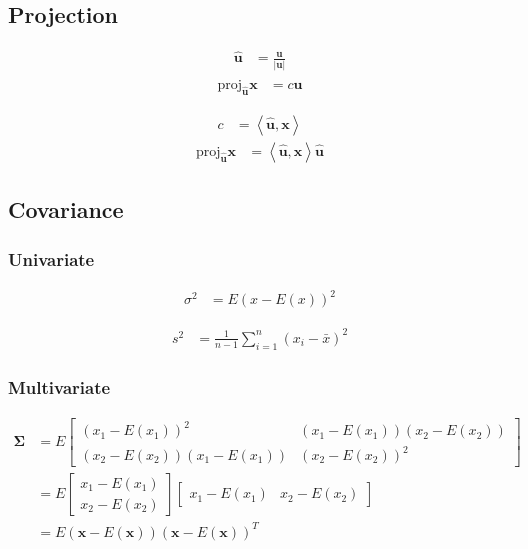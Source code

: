 \documentclass{article}
\begin{document}
\subsection{Projection}

\begin{align}
	\hat{\mathbf{u}} & =\frac{\mathbf{u}}{\left|\mathbf{u}\right|}
\end{align}
\begin{align}
	\textrm{proj}_{\hat{\mathbf{u}}}\mathbf{x} & =c\hat{\mathbf{u}}
\end{align}

\begin{align}
	c & =\left\langle \hat{\mathbf{u}},\mathbf{x}\right\rangle 
\end{align}
\begin{align}
	\textrm{proj}_{\hat{\mathbf{u}}}\mathbf{x} & =\left\langle \hat{\mathbf{u}},\mathbf{x}\right\rangle \hat{\mathbf{u}}
\end{align}

\subsection{Covariance}

\subsubsection{Univariate}

\begin{align}
	\sigma^{2} & =E\left(x-E\left(x\right)\right)^{2}
\end{align}

\begin{align}
	s^{2} & =\frac{1}{n-1}\sum_{i=1}^{n}\left(x_{i}-\bar{x}\right)^{2}
\end{align}

\subsubsection{Multivariate}

\begin{align}
	\mathbf{\Sigma} & =E\left[\begin{array}{cc}
		\left(x_{1}-E\left(x_{1}\right)\right)^{2} & \left(x_{1}-E\left(x_{1}\right)\right)\left(x_{2}-E\left(x_{2}\right)\right)\\
		\left(x_{2}-E\left(x_{2}\right)\right)\left(x_{1}-E\left(x_{1}\right)\right) & \left(x_{2}-E\left(x_{2}\right)\right)^{2}
	\end{array}\right]\\
	& =E\left[\begin{array}{c}
		x_{1}-E\left(x_{1}\right)\\
		x_{2}-E\left(x_{2}\right)
	\end{array}\right]\left[\begin{array}{cc}
		x_{1}-E\left(x_{1}\right) & x_{2}-E\left(x_{2}\right)\end{array}\right]\\
	& =E\left(\mathbf{x}-E\left(\mathbf{x}\right)\right)\left(\mathbf{x}-E\left(\mathbf{x}\right)\right)^{T}
\end{align}
\end{document}
